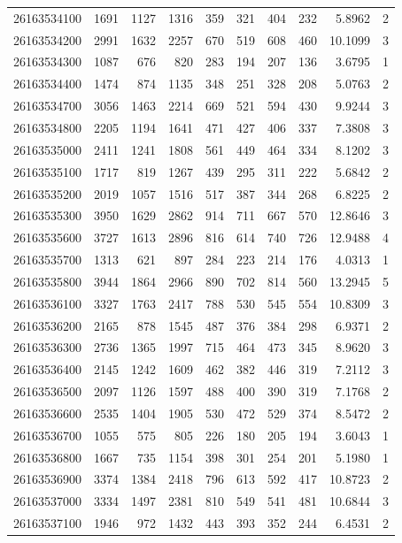 \documentclass[11pt,landscape]{article}
\begin{document}
{\begin{longtable}[]{@{}lrrrrrrrrr@{}}
26163534100 & 1691 & 1127 & 1316 & 359 & 321 & 404 & 232 & 5.8962 & 2 \\
26163534200 & 2991 & 1632 & 2257 & 670 & 519 & 608 & 460 & 10.1099 & 3 \\
26163534300 & 1087 & 676 & 820 & 283 & 194 & 207 & 136 & 3.6795 & 1 \\
26163534400 & 1474 & 874 & 1135 & 348 & 251 & 328 & 208 & 5.0763 & 2 \\
26163534700 & 3056 & 1463 & 2214 & 669 & 521 & 594 & 430 & 9.9244 & 3 \\
26163534800 & 2205 & 1194 & 1641 & 471 & 427 & 406 & 337 & 7.3808 & 3 \\
26163535000 & 2411 & 1241 & 1808 & 561 & 449 & 464 & 334 & 8.1202 & 3 \\
26163535100 & 1717 & 819 & 1267 & 439 & 295 & 311 & 222 & 5.6842 & 2 \\
26163535200 & 2019 & 1057 & 1516 & 517 & 387 & 344 & 268 & 6.8225 & 2 \\
26163535300 & 3950 & 1629 & 2862 & 914 & 711 & 667 & 570 & 12.8646 & 3 \\
26163535600 & 3727 & 1613 & 2896 & 816 & 614 & 740 & 726 & 12.9488 & 4 \\
26163535700 & 1313 & 621 & 897 & 284 & 223 & 214 & 176 & 4.0313 & 1 \\
26163535800 & 3944 & 1864 & 2966 & 890 & 702 & 814 & 560 & 13.2945 & 5 \\
26163536100 & 3327 & 1763 & 2417 & 788 & 530 & 545 & 554 & 10.8309 & 3 \\
26163536200 & 2165 & 878 & 1545 & 487 & 376 & 384 & 298 & 6.9371 & 2 \\
26163536300 & 2736 & 1365 & 1997 & 715 & 464 & 473 & 345 & 8.9620 & 3 \\
26163536400 & 2145 & 1242 & 1609 & 462 & 382 & 446 & 319 & 7.2112 & 3 \\
26163536500 & 2097 & 1126 & 1597 & 488 & 400 & 390 & 319 & 7.1768 & 2 \\
26163536600 & 2535 & 1404 & 1905 & 530 & 472 & 529 & 374 & 8.5472 & 2 \\
26163536700 & 1055 & 575 & 805 & 226 & 180 & 205 & 194 & 3.6043 & 1 \\
26163536800 & 1667 & 735 & 1154 & 398 & 301 & 254 & 201 & 5.1980 & 1 \\
26163536900 & 3374 & 1384 & 2418 & 796 & 613 & 592 & 417 & 10.8723 & 2 \\
26163537000 & 3334 & 1497 & 2381 & 810 & 549 & 541 & 481 & 10.6844 & 3 \\
26163537100 & 1946 & 972 & 1432 & 443 & 393 & 352 & 244 & 6.4531 & 2 \\

\end{longtable}}
\end{document}
